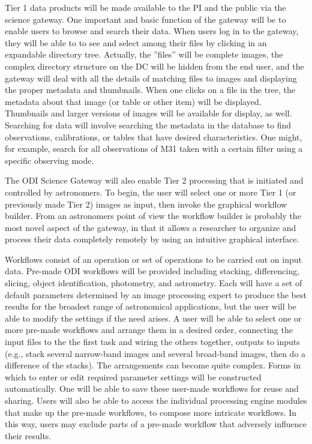 \documentclass[10pt,conference]{IEEEtran}
\begin{document}
Tier 1 data products will be made available to the PI and the public via the science gateway. One important and basic function of the gateway will be to enable users to browse and search their data.  When users log in to the gateway, they will be able to to see and select among their files by clicking in an expandable directory tree. Actually, the ''files'' will be complete images, the complex directory structure on the DC will be hidden from the end user, and the gateway will deal with all the details of matching files to images and displaying the proper metadata and thumbnails. When one clicks on a file in the tree, the metadata about that image (or table or other item) will be displayed. Thumbnails and larger versions of images will be available for display, as well.  
Searching for data will involve searching the metadata in the database to find observations, calibrations, or tables that have desired characteristics. One might, for example, search for all observations of M31 taken with a certain filter using a specific observing mode.

The ODI Science Gateway will also enable Tier 2 processing that is initiated and controlled by astronomers. To begin, the user will select one or more Tier 1 (or previously made Tier 2) images as input, then invoke the graphical workflow builder. From an astronomers point of view the workflow builder is probably the most novel aspect of the gateway, in that it allows a researcher to organize and process their data completely remotely by using an intuitive graphical interface.

Workflows consist of an operation or set of operations to be carried out on input data. Pre-made ODI workflows will be provided including stacking, differencing, slicing, object identification, photometry, and astrometry. Each will have a set of default parameters determined by an image processing expert to produce the best results for the broadest range of astronomical applications, but the user will be able to modify the settings if the need arises. A user will be able to select one or more pre-made workflows and arrange them in a desired order, connecting the input files to the the first task and wiring the others together, outputs to inputs (e.g., stack several narrow-band images and several broad-band images, then do a difference of the stacks). The arrangements can become quite complex. Forms in which to enter or edit required parameter settings will be constructed automatically. One will be able to save these user-made workflows for reuse and sharing.  Users will also be able to access the individual processing engine modules that make up the pre-made workflows, to compose more intricate workflows. In this way, users may exclude parts of a pre-made workflow that adversely influence their results.
\end{document}
